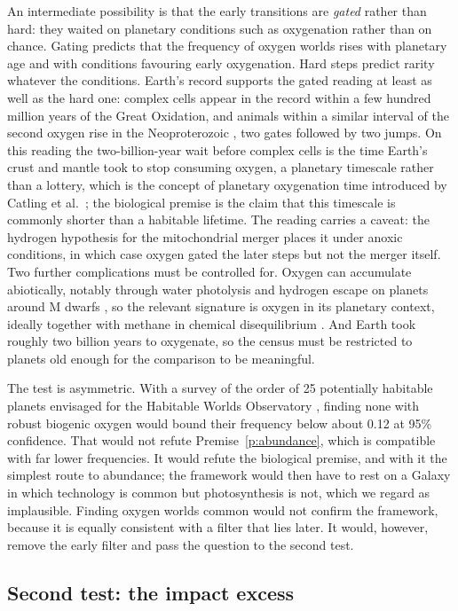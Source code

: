 \documentclass[preprint,12pt]{elsarticle}
\theoremstyle{definition}
\begin{document}
An intermediate possibility is that the early transitions are \emph{gated} rather than hard: they waited on planetary conditions such as oxygenation rather than on chance. Gating predicts that the frequency of oxygen worlds rises with planetary age and with conditions favouring early oxygenation. Hard steps predict rarity whatever the conditions. Earth's record supports the gated reading at least as well as the hard one: complex cells appear in the record within a few hundred million years of the Great Oxidation, and animals within a similar interval of the second oxygen rise in the Neoproterozoic \citep{Lyons2014}, two gates followed by two jumps. On this reading the two-billion-year wait before complex cells is the time Earth's crust and mantle took to stop consuming oxygen, a planetary timescale rather than a lottery, which is the concept of planetary oxygenation time introduced by Catling et al.\ \citep{Catling2005}; the biological premise is the claim that this timescale is commonly shorter than a habitable lifetime. The reading carries a caveat: the hydrogen hypothesis for the mitochondrial merger places it under anoxic conditions, in which case oxygen gated the later steps but not the merger itself. Two further complications must be controlled for. Oxygen can accumulate abiotically, notably through water photolysis and hydrogen escape on planets around M dwarfs \citep{LugerBarnes2015}, so the relevant signature is oxygen in its planetary context, ideally together with methane in chemical disequilibrium \citep{Meadows2018}. And Earth took roughly two billion years to oxygenate, so the census must be restricted to planets old enough for the comparison to be meaningful.

The test is asymmetric. With a survey of the order of 25 potentially habitable planets envisaged for the Habitable Worlds Observatory \citep{Astro2020}, finding none with robust biogenic oxygen would bound their frequency below about 0.12 at 95\% confidence. That would not refute Premise~\ref{p:abundance}, which is compatible with far lower frequencies. It would refute the biological premise, and with it the simplest route to abundance; the framework would then have to rest on a Galaxy in which technology is common but photosynthesis is not, which we regard as implausible. Finding oxygen worlds common would not confirm the framework, because it is equally consistent with a filter that lies later. It would, however, remove the early filter and pass the question to the second test.

\subsection{Second test: the impact excess}
\label{sec:impact}
\end{document}
